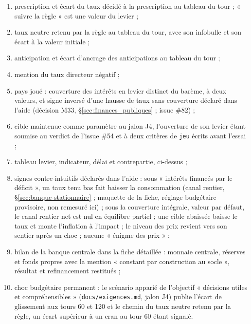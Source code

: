 \documentclass[11pt,a4paper]{article}
\begin{document}
\begin{joueur}
\begin{enumerate}
\item prescription et écart du taux décidé à la prescription au tableau du tour ; « suivre la règle » est une valeur du levier ;
\item taux neutre retenu par la règle au tableau du tour, avec son infobulle et son écart à la valeur initiale ;
\item anticipation et écart d'ancrage des anticipations au tableau du tour ;
\item mention du taux directeur négatif ;
\item pays joué : couverture des intérêts en levier distinct du barème, à deux valeurs, et signe inversé d'une hausse de taux sans couverture déclaré dans l'aide (décision M33, \S\ref{sec:finances_publiques} ; issue \#82) ;
\item cible maintenue comme paramètre au jalon J4, l'ouverture de son levier étant soumise au verdict de l'issue \#54 et à deux critères de \texttt{jeu} écrits avant l'essai ;
\item tableau levier, indicateur, délai et contrepartie, ci-dessus ;
\item signes contre-intuitifs déclarés dans l'aide : sous « intérêts financés par le déficit », un taux tenu bas fait baisser la consommation (canal rentier, \S\ref{sec:banque-stationnaire} ; maquette de la fiche, réglage budgétaire provisoire, non remesuré ici) ; sous la couverture intégrale, valeur par défaut, le canal rentier net est nul en équilibre partiel ; une cible abaissée baisse le taux et monte l'inflation à l'impact ; le niveau des prix revient vers son sentier après un choc ; aucune « énigme des prix » ;
\item bilan de la banque centrale dans la fiche détaillée : monnaie centrale, réserves et fonds propres avec la mention « constant par construction au socle », résultat et refinancement restitués ;
\item choc budgétaire permanent : le scénario apparié de l'objectif « décisions utiles et compréhensibles » (\nolinkurl{docs/exigences.md}, jalon J4) publie l'écart de glissement aux tours 60 et 120 et le chemin du taux neutre retenu par la règle, un écart supérieur à un cran au tour 60 étant signalé.
\end{enumerate}
\end{joueur}
\end{document}
